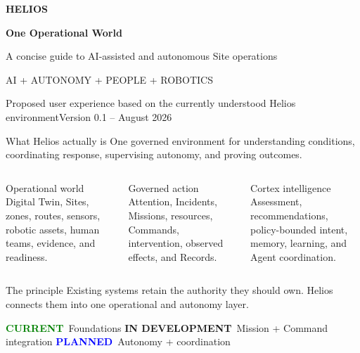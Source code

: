 \documentclass[aspectratio=169,10pt]{beamer}
\newcommand{\status}[2]{\textcolor{#1}{\scriptsize\bfseries #2}}
\newcommand{\tagcurrent}{\status{green}{CURRENT}}
\newcommand{\tagdev}{\status{amber}{IN DEVELOPMENT}}
\newcommand{\tagplanned}{\status{blue}{PLANNED}}
\begin{document}
\begin{frame}[plain]
\vspace{9mm}
{\color{mint}\Large\bfseries HELIOS}\par
\vfill
{\color{text}\fontsize{31}{35}\selectfont\bfseries One Operational World}\par\vspace{3mm}
{\color{text}\Large A concise guide to AI-assisted and autonomous Site operations}\par\vspace{8mm}
{\color{green}\large AI + AUTONOMY + PEOPLE + ROBOTICS}\par
\vfill
{\color{muted}\small Proposed user experience based on the currently understood Helios environment}\hfill{\color{muted}\small Version 0.1 -- August 2026}
\end{frame}

\begin{frame}{What Helios actually is}
{\large One governed environment for understanding conditions, coordinating response, supervising autonomy, and proving outcomes.}\vspace{3mm}
\begin{columns}[T]
\begin{block}{Operational world}
\small Digital Twin, Sites, zones, routes, sensors, robotic assets, human teams, evidence, and readiness.
\end{block}
\begin{block}{Governed action}
\small Attention, Incidents, Missions, resources, Commands, intervention, observed effects, and Records.
\end{block}
\begin{block}{Cortex intelligence}
\small Assessment, recommendations, policy-bounded intent, memory, learning, and Agent coordination.
\end{block}
\end{columns}
\vspace{3mm}
\begin{block}{The principle}
\centering Existing systems retain the authority they should own. Helios connects them into one operational and autonomy layer.
\end{block}
\vfill
\centering \tagcurrent\ Foundations \quad \tagdev\ Mission + Command integration \quad \tagplanned\ Autonomy + coordination
\end{frame}
\end{document}
